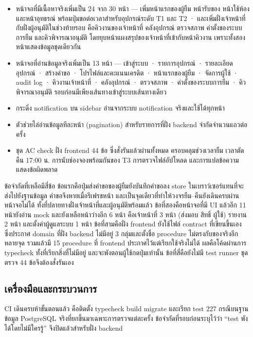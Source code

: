 \begin{itemize}
 \item หน้าจอที่มีเนื้อหาจริงเพิ่มเป็น 24 จาก 30 หน้า — เพิ่มหน้าแรกของผู้ยืม หน้ารับของ หน้าใช้ห้อง และหน้าอุทธรณ์ พร้อมปุ่มขอต่อเวลาสำหรับอุปกรณ์ระดับ T1 และ T2 · และเพิ่มฝั่งเจ้าหน้าที่กับฝั่งผู้อนุมัติในช่วงท้ายรอบ คือคิวงานของเจ้าหน้าที่ คลังอุปกรณ์ ตรวจสภาพ ค่าตั้งของระบบการยืม และคิวพิจารณาอนุมัติ โดยยุบหน้าแผงสรุปของเจ้าหน้าที่เข้ากับหน้าคิวงาน เพราะทั้งสองหน้าแสดงข้อมูลชุดเดียวกัน
 \item หน้าจอที่อ่านข้อมูลจริงเพิ่มเป็น 13 หน้า — เข้าสู่ระบบ · รายการอุปกรณ์ · รายละเอียดอุปกรณ์ · สร้างคำขอ · โปรไฟล์และคะแนนเครดิต · หน้าแรกของผู้ยืม · จัดการผู้ใช้ · audit log · คิวงานเจ้าหน้าที่ · คลังอุปกรณ์ · ตรวจสภาพ · ค่าตั้งของระบบการยืม · คิวพิจารณาอนุมัติ รอบก่อนมีเพียงเส้นทางเข้าสู่ระบบเส้นทางเดียว
 \item กระดิ่ง notification บน sidebar อ่านจากระบบ notification จริงและใช้ได้ทุกหน้า
 \item ตัวช่วยไล่อ่านข้อมูลทีละหน้า (pagination) สำหรับรายการที่ฝั่ง backend จำกัดจำนวนแถวต่อครั้ง
 \item ชุด AC check ฝั่ง frontend 44 ข้อ ซึ่งสั่งรันแล้วผ่านทั้งหมด ครอบคลุมช่วงเวลายืม เวลาตัดคืน 17:00 น. การนับช่องจองพร้อมกันของ T3 การตรวจไฟล์อัปโหลด และการแปลข้อความแสดงข้อผิดพลาด
\end{itemize}

ข้อจำกัดที่เหลือมีสี่ข้อ ข้อแรกคือปุ่มส่งคำขอของผู้ยืมยังบันทึกคำขอลง store ในเบราว์เซอร์แทนที่จะส่งไปยังฐานข้อมูล คำขอจึงหายเมื่อรีเฟรชหน้า และเป็นจุดเดียวที่ทำให้วงจรยืม–คืนยังเดินครบผ่านหน้าจอไม่ได้ ทั้งที่ปลายทางฝั่งเจ้าหน้าที่และผู้อนุมัติพร้อมแล้ว ข้อที่สองคือหน้าจอที่มี UI แล้วอีก 11 หน้ายังอ่าน mock และยังเหลือหน้าว่างอีก 6 หน้า คือเจ้าหน้าที่ 3 หน้า (ส่งมอบ สิทธิ์ ผู้ใช้) รายงาน 2 หน้า และตั้งค่าผู้ดูแลระบบ 1 หน้า ข้อที่สามคือฝั่ง frontend ยังใช้ไฟล์ contract ที่เขียนขึ้นเอง ซึ่งประกาศ domain ที่ฝั่ง backend ไม่มีอยู่ 3 กลุ่มและตั้งชื่อ procedure ไม่ตรงกับของจริงอีกหลายจุด รวมแล้วมี 15 procedure ที่ frontend ประกาศไว้แต่เรียกใช้จริงไม่ได้ ผลคือโค้ดผ่านการ typecheck ทั้งที่เรียกสิ่งที่ไม่มีอยู่ และจะพังตอนผู้ใช้กดปุ่มเท่านั้น ข้อที่สี่คือยังไม่มี test runner ชุดตรวจ 44 ข้อจึงต้องสั่งรันเอง

\subsection{เครื่องมือและกระบวนการ}

CI เดินครบห้าขั้นตอนแล้ว คือติดตั้ง typecheck build migrate และเรียก test 227 กรณีบนฐานข้อมูล PostgreSQL จริงที่ยกขึ้นมาเฉพาะการตรวจแต่ละครั้ง ข้อจำกัดที่รอบก่อนระบุไว้ว่า ``test พังได้โดยไม่มีใครรู้'' จึงปิดแล้วสำหรับฝั่ง backend


